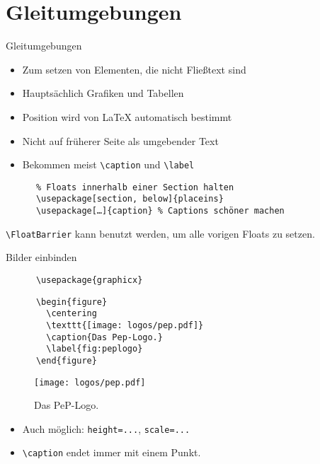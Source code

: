\section{Gleitumgebungen}
\begin{frame}[fragile]{
  Gleitumgebungen
  \hfill
}
  \begin{itemize}
    \item Zum setzen von Elementen, die nicht Fließtext sind
    \item Hauptsächlich Grafiken und Tabellen
    \item Position wird von \LaTeX{} automatisch bestimmt
    \item Nicht auf früherer Seite als umgebender Text
    \item Bekommen meist \lstinline+\caption+ und \lstinline+\label+
  \end{itemize}
  \begin{Packages}
    \begin{lstlisting}
      % Floats innerhalb einer Section halten
      \usepackage[section, below]{placeins}
      \usepackage[…]{caption} % Captions schöner machen
    \end{lstlisting}
  \end{Packages}

  \lstinline+\FloatBarrier+ kann benutzt werden, um alle vorigen Floats zu setzen.
\end{frame}

\begin{frame}[fragile]{
  Bilder einbinden
  \hfill
}
  \begin{Packages}
    \begin{lstlisting}
      \usepackage{graphicx}
    \end{lstlisting}
  \end{Packages}
  \begin{CodeExample}{0.65}
    \begin{lstlisting}
      \begin{figure}
        \centering
        \texttt{[image: logos/pep.pdf]}
        \caption{Das Pep-Logo.}
        \label{fig:peplogo}
      \end{figure}
    \end{lstlisting}
  \CodeResult
    \begin{figure}
      \centering
      \texttt{[image: logos/pep.pdf]}
      \caption{Das PeP-Logo.}
      \label{fig:peplogo}
    \end{figure}
  \end{CodeExample}
  \vspace{5pt}
  \begin{itemize}
    \item Auch möglich: \lstinline+height=...+, \lstinline+scale=...+
    \item \lstinline+\caption+ endet immer mit einem Punkt.
  \end{itemize}
\end{frame}

